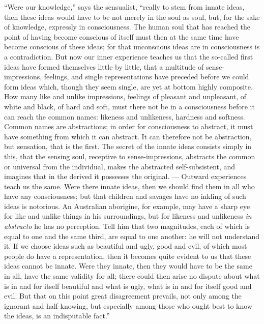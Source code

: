 \documentclass[12pt]{book}
\begin{document}
``Were our knowledge,'' says the sensualist, ``really to stem from innate
ideas, then these ideas would have to be not merely in the soul as soul, but,
for the sake of knowledge, expressly in consciousness. The human soul that has
reached the point of having become conscious of itself must then at the same
time have become conscious of these ideas; for that unconscious ideas are in
consciousness is a contradiction. But now our inner experience teaches us that
the so-called first ideas have formed themselves little by little, that a
multitude of sense-impressions, feelings, and single representations have
preceded before we could form ideas which, though they seem single, are yet at
bottom highly composite. How many like and unlike impressions, feelings of
pleasant and unpleasant, of white and black, of hard and soft, must there not
be in a consciousness before it can reach the common names: likeness and
unlikeness, hardness and softness. Common names are abstractions; in order for
consciousness to abstract, it must have something from which it can abstract.
It can therefore not be abstraction, but sensation, that is the first. The
secret of the innate ideas consists simply in this, that the sensing soul,
receptive to sense-impressions, abstracts the common or universal from the
individual, makes the abstracted self-subsistent, and imagines that in the
derived it possesses the original. --- Outward experiences teach us the same.
Were there innate ideas, then we should find them in all who have any
consciousness; but that children and savages have no inkling of such ideas is
notorious. An Australian aborigine, for example, may have a sharp eye for like
and unlike things in his surroundings, but for likeness and unlikeness
\textit{in abstracto} he has no perception. Tell him that two magnitudes, each
of which is equal to one and the same third, are equal to one another: he will
not understand it. If we choose ideas such as beautiful and ugly, good and
evil, of which most people do have a representation, then it becomes quite
evident to us that these ideas cannot be innate. Were they innate, then they
would have to be the same in all, have the same validity for all; there could
then arise no dispute about what is in and for itself beautiful and what is
ugly, what is in and for itself good and evil. But that on this point great
disagreement prevails, not only among the ignorant and half-knowing, but
especially among those who ought best to know the ideas, is an indisputable
fact.''
\end{document}
